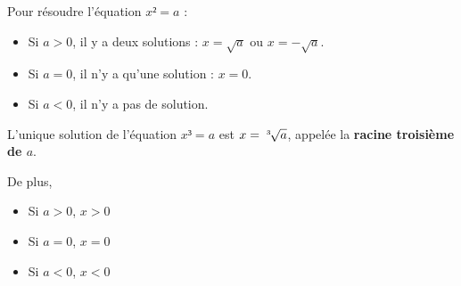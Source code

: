\documentclass[
	classe=$1^{ere}STI2D$,
]{coursclass}
\begin{document}
\begin{propriete}
	Pour résoudre l'équation $x² = a$ :
	\begin{itemize}
		\item Si $a > 0$, il y a deux solutions : $x = \sqrt{a}$ ou $x = -\sqrt{a}$.
		\item Si $a = 0$, il n'y a qu'une solution : $x = 0$.
		\item Si $a < 0$, il n'y a pas de solution.
	\end{itemize}
\end{propriete}

\begin{propriete}
	L'unique solution de l'équation $x³ = a$ est $x = \sqrt[3\hspace{0.5em}]{a}$, appelée la \textbf{racine troisième de $a$}.

	De plus,
	\begin{itemize}
		\item Si $a > 0$, $x > 0$
		\item Si $a = 0$, $x = 0$
		\item Si $a < 0$, $x < 0$
	\end{itemize}
\end{propriete}
\end{document}
